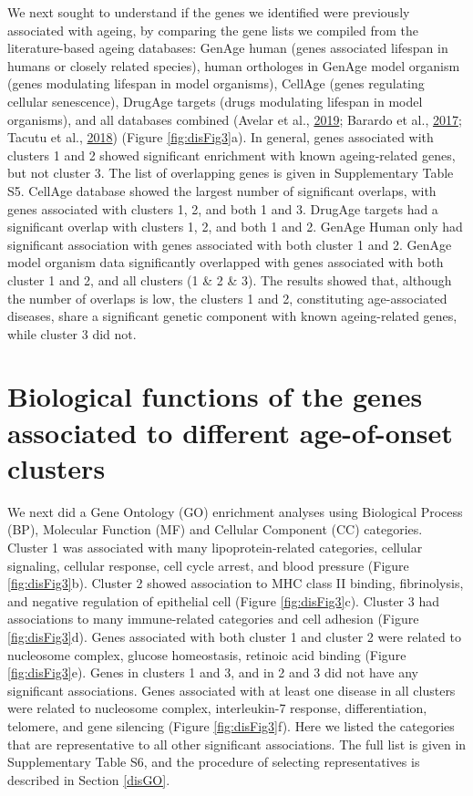 \documentclass[12pt,twoside]{unicam}
\begin{document}
We next sought to understand if the genes we identified were previously associated with ageing, by comparing the gene lists we compiled from the literature-based ageing databases: GenAge human (genes associated lifespan in humans or closely related species), human orthologes in GenAge model organism (genes modulating lifespan in model organisms), CellAge (genes regulating cellular senescence), DrugAge targets (drugs modulating lifespan in model organisms), and all databases combined (Avelar et al., \protect\hyperlink{ref-Avelar2019}{2019}; Barardo et al., \protect\hyperlink{ref-Barardo2017}{2017}; Tacutu et al., \protect\hyperlink{ref-Tacutu2018}{2018}) (Figure \ref{fig:disFig3}a). In general, genes associated with clusters 1 and 2 showed significant enrichment with known ageing-related genes, but not cluster 3. The list of overlapping genes is given in Supplementary Table S5. CellAge database showed the largest number of significant overlaps, with genes associated with clusters 1, 2, and both 1 and 3. DrugAge targets had a significant overlap with clusters 1, 2, and both 1 and 2. GenAge Human only had significant association with genes associated with both cluster 1 and 2. GenAge model organism data significantly overlapped with genes associated with both cluster 1 and 2, and all clusters (1 \& 2 \& 3). The results showed that, although the number of overlaps is low, the clusters 1 and 2, constituting age-associated diseases, share a significant genetic component with known ageing-related genes, while cluster 3 did not.

\hypertarget{biological-functions-of-the-genes-associated-to-different-age-of-onset-clusters}{%
\section{Biological functions of the genes associated to different age-of-onset clusters}\label{biological-functions-of-the-genes-associated-to-different-age-of-onset-clusters}}

We next did a Gene Ontology (GO) enrichment analyses using Biological Process (BP), Molecular Function (MF) and Cellular Component (CC) categories. Cluster 1 was associated with many lipoprotein-related categories, cellular signaling, cellular response, cell cycle arrest, and blood pressure (Figure \ref{fig:disFig3}b). Cluster 2 showed association to MHC class II binding, fibrinolysis, and negative regulation of epithelial cell (Figure \ref{fig:disFig3}c). Cluster 3 had associations to many immune-related categories and cell adhesion (Figure \ref{fig:disFig3}d). Genes associated with both cluster 1 and cluster 2 were related to nucleosome complex, glucose homeostasis, retinoic acid binding (Figure \ref{fig:disFig3}e). Genes in clusters 1 and 3, and in 2 and 3 did not have any significant associations. Genes associated with at least one disease in all clusters were related to nucleosome complex, interleukin-7 response, differentiation, telomere, and gene silencing (Figure \ref{fig:disFig3}f). Here we listed the categories that are representative to all other significant associations. The full list is given in Supplementary Table S6, and the procedure of selecting representatives is described in Section \ref{disGO}.
\end{document}
